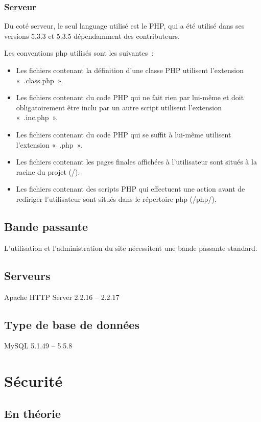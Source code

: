 \documentclass[letter, 11pt, draft]{report}
\begin{document}
\subsubsection{Serveur}
Du coté serveur, le seul language utilisé est le PHP, qui a été utilisé dans ses versions 5.3.3 et 5.3.5 dépendamment des contributeurs.

Les conventions php utilisés sont les suivantes~:

\begin{itemize}
	\item Les fichiers contenant la définition d'une classe PHP utilisent l'extension «~.class.php~».
	\item Les fichiers contenant du code PHP qui ne fait rien par lui-même et doit obligatoirement être inclu par un autre script utilisent l'extension «~.inc.php~».
	\item Les fichiers contenant du code PHP qui se suffit à lui-même utilisent l'extension «~.php~».
	\item Les fichiers contenant les pages finales affichées à l'utilisateur sont situés à la racine du projet (/).
	\item Les fichiers contenant des scripts PHP qui effectuent une action avant de rediriger l'utilisateur sont situés dans le répertoire php (/php/).
\end{itemize}

\subsection{Bande passante}
L'utilisation et l'administration du site nécessitent une bande passante standard.

\subsection{Serveurs}
Apache HTTP Server 2.2.16 -- 2.2.17

\subsection{Type de base de données}
MySQL 5.1.49 -- 5.5.8

\section{Sécurité}
\subsection{En théorie}
\end{document}
